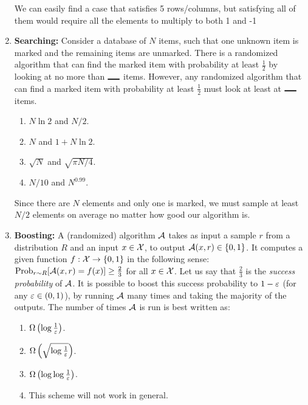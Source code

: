 \documentclass[11pt, svgnames]{article}
\begin{document}
\begin{enumerate}

We can easily find a case that satisfies 5 rows/columns, but satisfying all of them would require all the elements to multiply to both 1 and -1

\item {\bf Searching:} Consider a database of $N$ items, such that one unknown item is marked and the remaining items are unmarked. There is a randomized algorithm that can find the marked item with probability at least $\frac{1}{2}$ by looking at no more than $\rule{0.5cm}{0.05cm}$ items. However, any randomized algorithm that can find a marked item with probability at least $\frac{1}{2}$ must look at least at $\rule{0.5cm}{0.05cm}$ items.  
\begin{enumerate}
\item $N\ln 2$ and $N/2$.
\item $N$ and $1+N\ln 2$.
\item $\sqrt{N}$ and $\sqrt{\pi N/4}$.
\item $N/10$ and $N^{0.99}$.
\end{enumerate}


Since there are $N$ elements and only one is marked, we must sample at least $N/2$ elements on average no matter how good our algorithm is.

\item {\bf Boosting:} A (randomized) algorithm $\mathcal{A}$ takes as input a sample $r$ from a distribution $R$ and an input $x\in \mathcal{X}$, to output $\mathcal{A}(x,r)\in \{0,1\}$. It computes a given function $f:\mathcal{X}\rightarrow \{0,1\}$ in the following sense: $\mathrm{Prob}_{r\sim R}[\mathcal{A}(x,r)=f(x)]\geq \frac{2}{3}$ for all $x\in \mathcal{X}$. Let us say that $\frac{2}{3}$ is the \textit{success probability} of $\mathcal{A}$. It is possible to boost this success probability to $1-\varepsilon$ (for any $\varepsilon\in (0,1)$), by running $\mathcal{A}$ many times and taking the majority of the outputs. The number of times $\mathcal{A}$ is run is best written as:     
\begin{enumerate}
\item $\Omega\left(\log\frac{1}{\varepsilon}\right)$.
\item $\Omega\left(\sqrt{\log\frac{1}{\varepsilon}}\right)$.
\item $\Omega\left(\log\log\frac{1}{\varepsilon}\right)$.
\item This scheme will not work in general.
\end{enumerate}



\end{enumerate}
\end{document}
